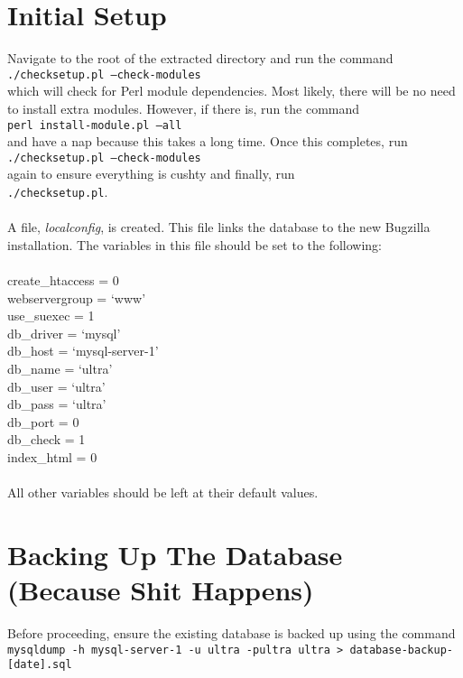 \documentclass[11pt, a4paper]{report}%
\begin{document}
\section{Initial Setup}
\label{sec:initsetup}
Navigate to the root of the extracted directory and run the command\\
{\tt ./checksetup.pl --check-modules}\\
which will check for Perl module dependencies. Most likely, there will be no need to install extra modules. However, if there is, run the command\\
{\tt perl install-module.pl --all}\\
and have a nap because this takes a long time.
\newpage
Once this completes, run\\
{\tt ./checksetup.pl --check-modules}\\
again to ensure everything is cushty and finally, run\\
{\tt ./checksetup.pl}.\\
\\
A file, \emph{localconfig}, is created. This file links the database to the new Bugzilla installation. The variables in this file should be set to the following:\\
\\
create\_htaccess = 0\\
webservergroup = `www'\\
use\_suexec = 1\\
db\_driver = `mysql'\\
db\_host = `mysql-server-1'\\
db\_name = `ultra'\\
db\_user = `ultra'\\
db\_pass = `ultra'\\
db\_port = 0\\
db\_check = 1\\
index\_html = 0\\\\
All other variables should be left at their default values.

\section{Backing Up The Database (Because Shit Happens)}
\label{sec:backupdb}
Before proceeding, ensure the existing database is backed up using the command {\tt mysqldump -h mysql-server-1 -u ultra -pultra ultra > database-backup-[date].sql}
\end{document}
